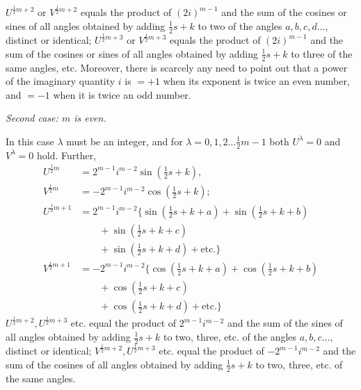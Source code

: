 $U^{\frac12m+2}$ or $V^{\frac12m+2}$ equals the product of $(2i)^{m-1}$ and the sum of the cosines or sines of all angles obtained by adding $\frac12s+k$ to two of the angles $a,b,c,d\ldots$, distinct or identical; $U^{\frac12m+3}$ or $V^{\frac12m+3}$ equals the product of $(2i)^{m-1}$ and the sum of the cosines or sines of all angles obtained by adding $\frac12s+k$ to three of the same angles, etc. Moreover, there is scarcely any need to point out that a power of the imaginary quantity $i$ is $=+1$ when its exponent is twice an even number, and $=-1$ when it is twice an odd number.
\begin{center}\textit{Second case: $m$ is even.}\end{center}
In this case $\lambda$ must be an integer, and for $\lambda=0,1,2\ldots\frac12m-1$ both $U^\lambda=0$ and $V^\lambda=0$ hold. Further,
\[
\begin{aligned}
U^{\frac12m}&=2^{m-1}i^{m-2}\sin(\tfrac12s+k),\\
V^{\frac12m}&=-2^{m-1}i^{m-2}\cos(\tfrac12s+k);\\
U^{\frac12m+1}&=2^{m-1}i^{m-2}\{\sin(\tfrac12s+k+a)+\sin(\tfrac12s+k+b)\\&\qquad+\sin(\tfrac12s+k+c)\\
&\qquad+\sin(\tfrac12s+k+d)+\text{etc.}\}\\
V^{\frac12m+1}&=-2^{m-1}i^{m-2}\{\cos(\tfrac12s+k+a)+\cos(\tfrac12s+k+b)\\&\qquad+\cos(\tfrac12s+k+c)\\
&\qquad+\cos(\tfrac12s+k+d)+\text{etc.}\}
\end{aligned}
\]
$U^{\frac12m+2},U^{\frac12m+3}$ etc. equal the product of $2^{m-1}i^{m-2}$ and the sum of the sines of all angles obtained by adding $\frac12s+k$ to two, three, etc. of the angles $a,b,c\ldots$, distinct or identical; $V^{\frac12m+2},U^{\frac12m+3}$ etc. equal the product of $-2^{m-1}i^{m-2}$ and the sum of the cosines of all angles obtained by adding $\frac12s+k$ to two, three, etc. of the same angles.
\endgroup

